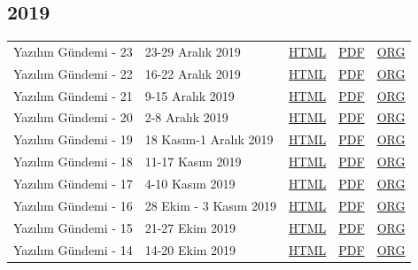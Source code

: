 \documentclass[11pt]{article}
\begin{document}
\subsection*{2019}
\label{sec:org3b51c0d}
\begin{center}
\begin{tabular}{lllll}
\hline
Yazılım Gündemi - 23 & 23-29 Aralık 2019 & \href{arsiv/2019/23/yazilim-gundemi-23.html}{HTML} & \href{arsiv/2019/23/yazilim-gundemi-23.pdf}{PDF} & \href{arsiv/2019/23/yazilim-gundemi-23.pdf}{ORG}\\
Yazılım Gündemi - 22 & 16-22 Aralık 2019 & \href{arsiv/2019/22/yazilim-gundemi-22.html}{HTML} & \href{arsiv/2019/22/yazilim-gundemi-22.pdf}{PDF} & \href{arsiv/2019/22/yazilim-gundemi-22.pdf}{ORG}\\
Yazılım Gündemi - 21 & 9-15 Aralık 2019 & \href{arsiv/2019/21/yazilim-gundemi-21.html}{HTML} & \href{arsiv/2019/21/yazilim-gundemi-21.pdf}{PDF} & \href{arsiv/2019/21/yazilim-gundemi-21.pdf}{ORG}\\
Yazılım Gündemi - 20 & 2-8 Aralık 2019 & \href{arsiv/2019/20/yazilim-gundemi-20.html}{HTML} & \href{arsiv/2019/20/yazilim-gundemi-20.pdf}{PDF} & \href{arsiv/2019/20/yazilim-gundemi-20.pdf}{ORG}\\
Yazılım Gündemi - 19 & 18 Kasım-1 Aralık 2019 & \href{arsiv/2019/19/yazilim-gundemi-19.html}{HTML} & \href{arsiv/2019/19/yazilim-gundemi-19.pdf}{PDF} & \href{arsiv/2019/19/yazilim-gundemi-19.pdf}{ORG}\\
Yazılım Gündemi - 18 & 11-17 Kasım 2019 & \href{arsiv/2019/18/yazilim-gundemi-18.html}{HTML} & \href{arsiv/2019/18/yazilim-gundemi-18.pdf}{PDF} & \href{arsiv/2019/18/yazilim-gundemi-18.pdf}{ORG}\\
Yazılım Gündemi - 17 & 4-10 Kasım 2019 & \href{arsiv/2019/17/yazilim-gundemi-17.html}{HTML} & \href{arsiv/2019/17/yazilim-gundemi-17.pdf}{PDF} & \href{arsiv/2019/17/yazilim-gundemi-17.pdf}{ORG}\\
Yazılım Gündemi - 16 & 28 Ekim - 3 Kasım 2019 & \href{arsiv/2019/16/yazilim-gundemi-16.html}{HTML} & \href{arsiv/2019/16/yazilim-gundemi-16.pdf}{PDF} & \href{arsiv/2019/16/yazilim-gundemi-16.pdf}{ORG}\\
Yazılım Gündemi - 15 & 21-27 Ekim 2019 & \href{arsiv/2019/15/yazilim-gundemi-15.html}{HTML} & \href{arsiv/2019/15/yazilim-gundemi-15.pdf}{PDF} & \href{arsiv/2019/15/yazilim-gundemi-15.pdf}{ORG}\\
Yazılım Gündemi - 14 & 14-20 Ekim 2019 & \href{arsiv/2019/14/yazilim-gundemi-14.html}{HTML} & \href{arsiv/2019/14/yazilim-gundemi-14.pdf}{PDF} & \href{arsiv/2019/14/yazilim-gundemi-14.pdf}{ORG}\\

\end{tabular}
\end{center}
\end{document}
